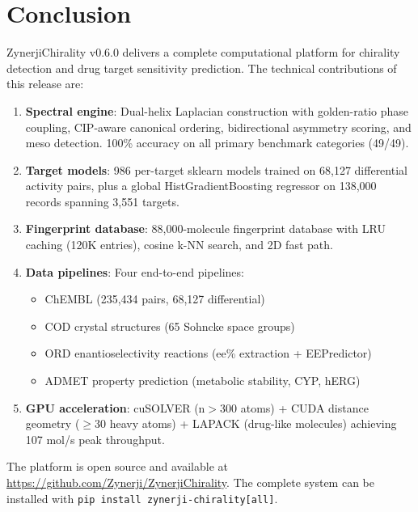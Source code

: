 \documentclass[11pt,a4paper]{article}
\begin{document}
\newpage

\section{Conclusion}
\label{sec:conclusion}

ZynerjiChirality v0.6.0 delivers a complete computational platform for
chirality detection and drug target sensitivity prediction. The technical
contributions of this release are:

\begin{enumerate}[leftmargin=1.5em]
  \item \textbf{Spectral engine}: Dual-helix Laplacian construction with
    golden-ratio phase coupling, CIP-aware canonical ordering, bidirectional
    asymmetry scoring, and meso detection. 100\% accuracy on all primary
    benchmark categories (49/49).

  \item \textbf{Target models}: 986 per-target sklearn models trained on
    68,127 differential activity pairs, plus a global HistGradientBoosting
    regressor on 138,000 records spanning 3,551 targets.

  \item \textbf{Fingerprint database}: 88,000-molecule fingerprint database
    with LRU caching (120K entries), cosine k-NN search, and 2D fast path.

  \item \textbf{Data pipelines}: Four end-to-end pipelines:
    \begin{itemize}[leftmargin=1.5em]
      \item ChEMBL (235,434 pairs, 68,127 differential)
      \item COD crystal structures (65 Sohncke space groups)
      \item ORD enantioselectivity reactions (ee\% extraction + EEPredictor)
      \item ADMET property prediction (metabolic stability, CYP, hERG)
    \end{itemize}

  \item \textbf{GPU acceleration}: cuSOLVER (n$>$300 atoms) + CUDA distance
    geometry ($\ge$30 heavy atoms) + LAPACK (drug-like molecules) achieving
    107 mol/s peak throughput.
\end{enumerate}

The platform is open source and available at
\url{https://github.com/Zynerji/ZynerjiChirality}. The complete system can be
installed with \texttt{pip install zynerji-chirality[all]}.
\end{document}
